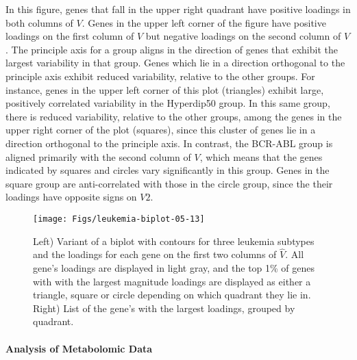 \documentclass[12pt]{article}
\begin{document}
In this figure, genes that fall in the upper right quadrant have
positive loadings in both columns of $V$. Genes in the upper left
corner of the figure have positive loadings on the first column of $V$
but negative loadings on the second column of $V$.  The principle axis
for a group aligns in the direction of genes that exhibit the largest
variability in that group.  Genes which lie in a direction orthogonal
to the principle axis exhibit reduced variability, relative to the
other groups. For instance, genes in the upper left corner of this
plot (triangles) exhibit large, positively correlated variability in
the Hyperdip50 group.  In this same group, there is reduced
variability, relative to the other groups, among the genes in the
upper right corner of the plot (squares), since this cluster of genes lie in
a direction orthogonal to the principle axis.  In contrast, the
BCR-ABL group is aligned primarily with the second column of $V$,
which means that the genes indicated by squares and circles vary
significantly in this group.  Genes in the square group are
anti-correlated with those in the circle group, since the their
loadings have opposite signs on $V2$.


  \begin{figure}[!ht]
    \centering
    \texttt{[image: Figs/leukemia-biplot-05-13]}
    \qquad
\raisebox{1.25\height}{
\footnotesize

}
\caption{Left) Variant of a biplot with contours for three leukemia
  subtypes and the loadings for each gene on the first two columns of
  $\hat{V}$.  All gene's loadings are displayed in light gray, and the
  top 1\% of genes with with the largest magnitude loadings are
  displayed as either a triangle, square or circle depending on which
  quadrant they lie in.  Right) List of the gene's with the largest
  loadings, grouped by quadrant. }
\label{fig:leukemiaBiplot}
  \end{figure}

\paragraph{Analysis of Metabolomic Data}
\end{document}

